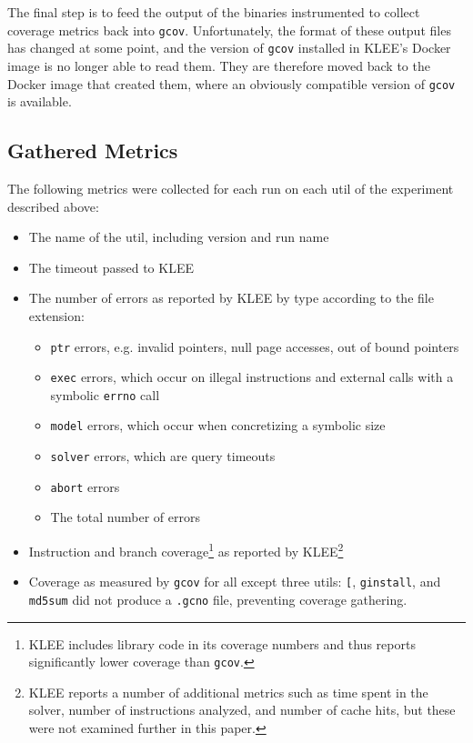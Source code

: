\documentclass{article}
\begin{document}
The final step is to feed the output of the binaries instrumented to collect coverage metrics back into \lstinline{gcov}. Unfortunately, the format of these output files has changed at some point, and the version of \lstinline{gcov} installed in KLEE's Docker image is no longer able to read them. They are therefore moved back to the Docker image that created them, where an obviously compatible version of \lstinline{gcov} is available.

\subsection{Gathered Metrics}

The following metrics were collected for each run on each util of the experiment described above:

\begin{itemize}
    \item The name of the util, including version and run name
    \item The timeout passed to KLEE
    \item The number of errors as reported by KLEE by type according to the file extension:
          \begin{itemize}
              \item \lstinline{ptr} errors, e.g. invalid pointers, null page accesses, out of bound pointers
              \item \lstinline{exec} errors, which occur on illegal instructions and external calls with a symbolic \lstinline{errno} call
              \item \lstinline{model} errors, which occur when concretizing a symbolic size
              \item \lstinline{solver} errors, which are query timeouts
              \item \lstinline{abort} errors
              \item The total number of errors
          \end{itemize}
    \item Instruction and branch coverage\footnote{KLEE includes library code in its coverage numbers and thus reports significantly lower coverage than \lstinline{gcov}.} as reported by KLEE\footnote{KLEE reports a number of additional metrics such as time spent in the solver, number of instructions analyzed, and number of cache hits, but these were not examined further in this paper.}
    \item Coverage as measured by \lstinline{gcov} for all except three utils: \lstinline{[}, \lstinline{ginstall}, and \lstinline{md5sum} did not produce a \lstinline{.gcno} file, preventing coverage gathering.
\end{itemize}
\end{document}
